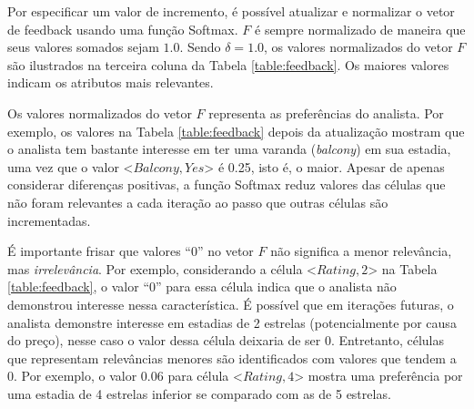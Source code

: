 Por especificar um valor de incremento, é possível atualizar e normalizar o vetor de feedback usando uma função Softmax. $F$ é sempre normalizado de maneira que seus valores somados sejam $1.0$. Sendo $\delta = 1.0$, os valores normalizados do vetor $F$ são ilustrados na terceira coluna da Tabela \ref{table:feedback}. Os maiores valores indicam os atributos mais relevantes.

Os valores normalizados do vetor $F$ representa as preferências do analista. Por exemplo, os valores na Tabela \ref{table:feedback} depois da atualização mostram que o analista tem bastante interesse em ter uma varanda ({\em balcony}) em sua estadia, uma vez que o valor \textless{}$Balcony, Yes$\textgreater{} é 0.25, isto é, o maior. Apesar de apenas considerar diferenças positivas, a função Softmax reduz valores das células que não foram relevantes a cada iteração ao passo que outras células são incrementadas.

É importante frisar que valores ``0'' no vetor $F$ não significa a menor relevância, mas {\em irrelevância}. Por exemplo, considerando a célula \textless{}$Rating, 2$\textgreater{} na Tabela \ref{table:feedback}, o valor ``0'' para essa célula indica que o analista não demonstrou interesse nessa característica. É possível que em iterações futuras, o analista demonstre interesse em estadias de 2 estrelas (potencialmente por causa do preço), nesse caso o valor dessa célula deixaria de ser 0. Entretanto, células que representam relevâncias menores são identificados com valores que tendem a 0. Por exemplo, o valor 0.06 para célula \textless{}$Rating, 4$\textgreater{} mostra uma preferência por uma estadia de 4 estrelas inferior se comparado com as de 5 estrelas.

